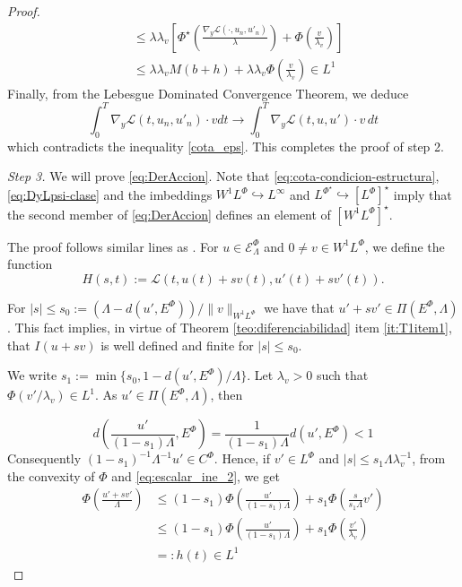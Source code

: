 \documentclass[twoside]{article}
\theoremstyle{remark}
\newcommand{\lphi}{L^{\Phi}}
\newcommand{\lpsi}{L^{\Phi^{\star}}}
\newcommand{\ephi}{E^{\Phi}}
\newcommand{\wphi}{W^{1}\lphi}
\newcommand{\sobnor}{\|_{W^{1}\lphi}}
\newcommand{\domi}{\mathcal{E}^{\Phi}}
\renewcommand{\leq}{\leqslant}
\begin{document}
\begin{proof}
\begin{equation}
\begin{split}
&\leq 
\lambda\lambda_v\left[\Phi^{\star}\left(\frac{\nabla_y\mathcal{L}(\cdot,u_{n},u'_{n})}{\lambda}\right)+\Phi\left(\frac{v}{\lambda_v}\right)\right]
\\
&\leq \lambda\lambda_v M (b+h)+\lambda\lambda_v  \Phi\left(\frac{v}{\lambda_v}\right)\in L^1
\end{split}
\end{equation}
  Finally, from the Lebesgue Dominated Convergence Theorem, we deduce
\begin{equation}\label{conv_debil}
\int_0^T  \nabla_y\mathcal{L}(t,u_{n},u'_{n})
\cdot  v dt
\to 
\int_0^T \nabla_y\mathcal{L}(t,u,u')\cdot v\, dt \end{equation}
which contradicts the inequality \eqref{cota_eps}. This completes the proof of step 2.

\emph{Step 3.} We will prove \eqref{eq:DerAccion}. 
 Note that \eqref{eq:cota-condicion-estructura},  \eqref{eq:DyLpsi-clase} and the imbeddings $\wphi \hookrightarrow L^{\infty}$ and  
$\lpsi\hookrightarrow  \left[\lphi\right]^{\star}$ imply that the second member of
\eqref{eq:DerAccion} defines an element of $\left[\wphi\right]^{\star}$.

The proof follows similar lines as \cite[Thm. 1.4]{mawhin2010critical}. 
For $u\in \domi_{\Lambda}$ and $0\neq v\in\wphi$, we define the function
\[H(s,t):=\mathcal{L}(t,u(t)+s v(t),u'(t)+sv'(t)).\]



For  $|s|\leq s_0:=\left(\Lambda-d(u',\ephi)\right)/\|v\sobnor$  we have that  $u'+sv' \in \Pi(\ephi,\Lambda)$. 
This fact implies, in virtue of Theorem \ref{teo:diferenciabilidad} item \ref{it:T1item1}, 
that $I(u+s v)$ is well defined and finite for $|s|\leq s_0$. 



We write $s_1:=\min\{s_0,1-d(u',\ephi)/\Lambda\}$. Let $\lambda_v>0$ such that $\Phi(v'/\lambda_v)\in L^1$. As $u'\in\Pi(\ephi,\Lambda)$, then

\[
d\left(\frac{u'}{(1-s_1)\Lambda},E^{\Phi}\right)=\frac{1}{(1-s_1)\Lambda}d(u', E^{\Phi})<1
\]
Consequently  $(1-s_1)^{-1}\Lambda^{-1}u'\in C^\Phi$. Hence,  if $v'\in\lphi$ and $|s|\leq s_1 \Lambda\lambda_v^{-1}$, from the convexity of $\Phi$ and \eqref{eq:escalar_ine_2}, we get
\begin{equation}\label{eq:cota-u+sv}
\begin{split}
\Phi\left(\frac{u'+sv'}{\Lambda}\right)&
\leq
(1-s_1)\Phi\left(\frac{u'}{(1-s_1)\Lambda}\right)+s_1 \Phi\left(\frac{s}{s_1\Lambda}v'\right)
\\
&\leq
(1-s_1)\Phi\left(\frac{u'}{(1-s_1)\Lambda}\right)+s_1 \Phi\left(\frac{v'}{\lambda_v}\right)\\
&=:h(t) \in L^1
\end{split}
\end{equation}




\end{proof}
\end{document}

